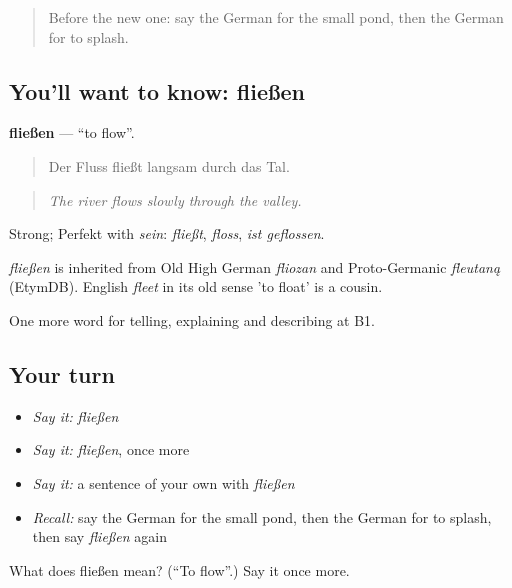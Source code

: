 \label{lesson:GE-C455-fliessen}



\begin{quote}
Before the new one: say the German for the small pond, then the German for to splash.
\end{quote}

\subsection*{You'll want to know: fließen}
\textbf{fließen} — \textquotedblleft{}to flow\textquotedblright{}.

\begin{quote}
Der Fluss fließt langsam durch das Tal.
\end{quote}

\begin{quote}
\emph{The river flows slowly through the valley.}
\end{quote}

Strong; Perfekt with \emph{sein}: \emph{fließt}, \emph{floss}, \emph{ist geflossen}.

\begin{cousinweb}
\emph{fließen} is inherited from Old High German \emph{fliozan} and Proto-Germanic \emph{fleutaną} (EtymDB). English \emph{fleet} in its old sense 'to float' is a cousin.
\end{cousinweb}

\begin{grammarlens}[title={What you've built}]
One more word for telling, explaining and describing at B1.
\end{grammarlens}

\subsection*{Your turn}
\begin{itemize}
\raggedright
  \item \emph{Say it:} \emph{fließen}
  \item \emph{Say it:} \emph{fließen}, once more
  \item \emph{Say it:} a sentence of your own with \emph{fließen}
  \item \emph{Recall:} say the German for the small pond, then the German for to splash, then say \emph{fließen} again
\end{itemize}

\begin{tcolorbox}[breakable,colback=teal!4,colframe=teal!35!black,title={Before you move on}]
What does fließen mean? (\textquotedblleft{}To flow\textquotedblright{}.) Say it once more.
\end{tcolorbox}
